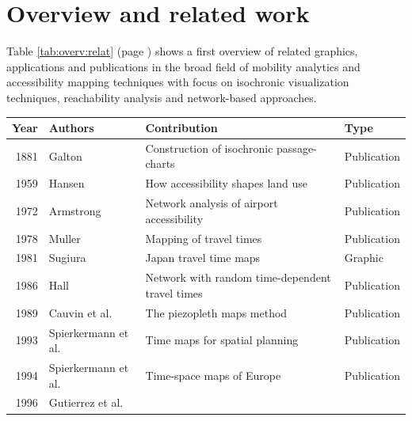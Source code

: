 
\cleardoublepage
\chapter{Overview and related work}
  \label{chap:overv}

  Table \ref{tab:overv:relat} (page \pageref{tab:overv:relat}) shows a first
  overview of related graphics, applications and publications in the broad
  field of mobility analytics and accessibility mapping techniques with focus
  on isochronic visualization techniques, reachability analysis and
  network-based approaches.\par

  \begin{table}[htp]
    \tiny \centering
    \begin{tabular}{r|l|l|l}
      \textbf{Year}
        & \textbf{Authors}
        & \textbf{Contribution}
        & \textbf{Type} \\
      \hline
      1881
        & Galton \cite{galton1881construction}
        & Construction of isochronic passage-charts
        & Publication \\
      1959
        & Hansen \cite{hansen1959accessibility}
        & How accessibility shapes land use
        & Publication \\
      1972
        & Armstrong \cite{armstrong1972network}
        & Network analysis of airport accessibility
        & Publication \\
      1978
        & Muller \cite{muller1978mapping}
        & Mapping of travel times
        & Publication \\
      1981
        & Sugiura \cite{Sugiura1981}
        & Japan travel time maps
        & Graphic \\
      1986
        & Hall \cite{hall1986fastest}
        & Network with random time-dependent travel times
        & Publication \\
      1989
        & Cauvin et al. \cite{cauvin1989cartographic}
        & The piezopleth maps method
        & Publication \\
      1993
        & Spierkermann et al. \cite{spiekermann1993zeitkarten}
        & Time maps for spatial planning
        & Publication \\
      1994
        & Spierkermann et al. \cite{spiekermann1994new}
        & Time-space maps of Europe
        & Publication \\
      1996
        & Gutierrez et al. \cite{gutierrez1996accessibility}

\end{tabular}
\end{table}
